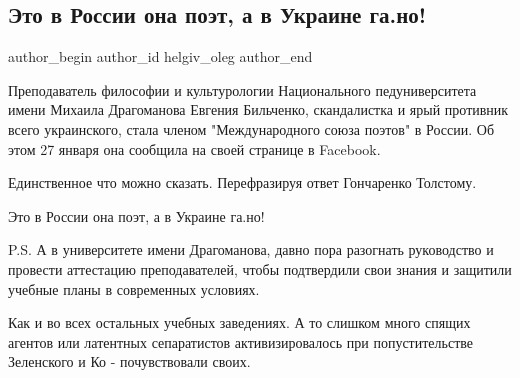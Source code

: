 
 
 
 
 
 
\subsection{Это в России она поэт, а в Украине га.но!}
\label{sec:29_01_2021.fb.helgiv_oleg.1.bilchenko}
 
\ifcmt
 author_begin
   author_id helgiv_oleg
 author_end
\fi

Преподаватель философии и культурологии Национального педуниверситета имени
Михаила Драгоманова Евгения Бильченко, скандалистка и ярый противник всего
украинского, стала членом "Международного союза поэтов" в России. Об этом 27
января она сообщила на своей странице в Facebook.

Единственное что можно сказать. Перефразируя ответ Гончаренко Толстому.

Это в России она поэт, а в Украине га.но!

P.S. А в университете имени Драгоманова, давно пора разогнать руководство и
провести аттестацию преподавателей, чтобы подтвердили свои знания и защитили
учебные планы в современных условиях. 

Как и во всех остальных учебных заведениях. А то слишком много спящих агентов
или латентных сепаратистов активизировалось при попустительстве Зеленского и Ко
- почувствовали своих.

